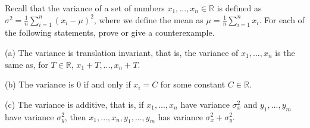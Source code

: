 \documentclass[10pt]{article}
\newenvironment{problem}[2][]{\begin{trivlist}
\item[\hskip \labelsep {\bfseries #1}\hskip \labelsep {\bfseries #2.}]}{\end{trivlist}}
\begin{document}
\begin{problem}{Question 2}

Recall that the variance of a set of numbers $x_1,...,x_n \in \mathbb{R}$ is defined as $\sigma^2 = \frac{1}{n} \sum_{i=1}^n (x_i - \mu)^2$, where we define the mean as $\mu = \frac{1}{n} \sum_{i=1}^n x_i$. For each of the following statements, prove or give a counterexample.

(a) The variance is translation invariant, that is, the variance of $x_1,...,x_n$ is the same as, for $T \in \mathbb{R}$, $x_1 + T,...,x_n + T$.

(b) The variance is 0 if and only if $x_i = C$ for some constant $C \in \mathbb{R}$.

(c) The variance is additive, that is, if $x_1,...,x_n$ have variance $\sigma_x^2$ and $y_1,...,y_m$ have variance $\sigma_y^2$, then $x_1,...,x_n,y_1,...,y_m$ has variance $\sigma_x^2 + \sigma_y^2$.

\end{problem}
\end{document}
